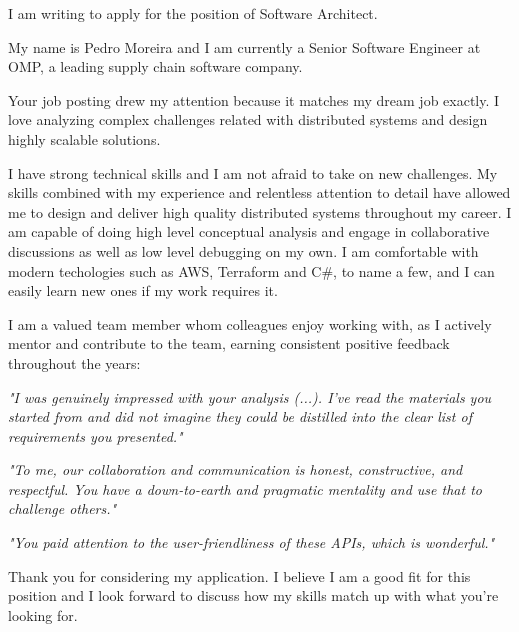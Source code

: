 I am writing to apply for the position of Software Architect.

My name is Pedro Moreira and I am currently a Senior Software Engineer at OMP, a leading supply chain software company.

Your job posting drew my attention because it matches my dream job exactly. I love analyzing complex challenges related with distributed systems and design highly scalable solutions.

I have strong technical skills and I am not afraid to take on new challenges. My skills combined with my experience and relentless attention to detail have allowed me to design and deliver high quality distributed systems throughout my career. I am capable of doing high level conceptual analysis and engage in collaborative discussions as well as low level debugging on my own. I am comfortable with modern techologies such as AWS, Terraform and C\#, to name a few, and I can easily learn new ones if my work requires it.

I am a valued team member whom colleagues enjoy working with, as I actively mentor and contribute to the team, earning consistent positive feedback throughout the years:

\emph{"I was genuinely impressed with your analysis (...). I've read the materials you started from and did not imagine they could be distilled into the clear list of requirements you presented."}

\emph{"To me, our collaboration and communication is honest, constructive, and respectful. You have a down-to-earth and pragmatic mentality and use that to challenge others."}

\emph{"You paid attention to the user-friendliness of these APIs, which is wonderful."}

Thank you for considering my application. I believe I am a good fit for this position and I look forward to discuss how my skills match up with what you're looking for.
